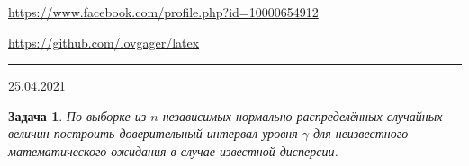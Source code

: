 \documentclass[12pt]{article}
\begin{document}


\begin{flushleft}
\url{https://www.facebook.com/profile.php?id=10000654912}

\url{https://github.com/lovgager/latex}
\end{flushleft}
\hrule 
\begin{flushright}
25.04.2021
\end{flushright}
\bigskip


\newtheorem*{task}{Задача}
\begin{task}
По выборке из $n$ независимых нормально распределённых случайных величин построить доверительный интервал уровня $\gamma$ для неизвестного математического ожидания в случае известной дисперсии.
\end{task}
\end{document}
